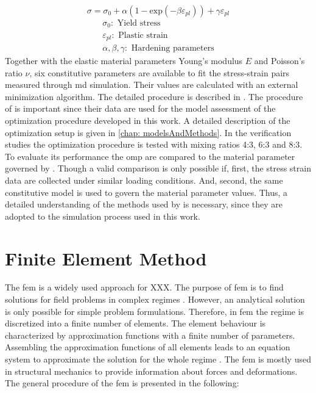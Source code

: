 \begin{equation} \label{eq: voce}
    \sigma = \sigma_0 + \alpha(1 - \text{exp}(-\beta \varepsilon_{pl})) + \gamma \varepsilon_{pl}
\end{equation}
\begin{gather*}
    \sigma_0: \text{ Yield stress} \\
    \varepsilon_{pl}: \text{ Plastic strain} \\
    \alpha, \beta,  \gamma: \text{ Hardening parameters}
\end{gather*}
Together with the elastic material parameters Young's modulus $E$ and Poisson's ratio $\nu$, six constitutive parameters are available to fit the stress-strain pairs measured through \acrshort{md} simulation. Their values are calculated with an external minimization algorithm. The detailed procedure is described in \cite{ries_deciphering_nodate}. The procedure of \citet{ries_deciphering_nodate} is important since their data are used for the model assessment of the optimization procedure developed in this work. A detailed description of the optimization setup is given in \autoref{chap: modelsAndMethods}. In the verification studies the optimization procedure is tested with mixing ratios 4:3, 6:3 and 8:3. To evaluate its performance the \acrlong{omp} are compared to the material parameter governed by \citet{ries_deciphering_nodate}. Though a valid comparison is only possible if, first, the stress strain data are collected under similar loading conditions. And, second, the same constitutive model is used to govern the material parameter values. Thus, a detailed understanding of the methods used by \citet{ries_deciphering_nodate} is necessary, since they are adopted to the simulation process used in this work.  



\section{Finite Element Method} \label{sec: FEMBasics}

The \acrfull{fem} is a widely used approach for XXX. 
The purpose of \acrshort{fem} is to find solutions for field problems in complex regimes \cite{willner_vorlesungsskript_nodate}. However, an analytical solution is only possible for simple problem formulations. Therefore, in \acrshort{fem} the regime is discretized into a finite number of elements. The element behaviour is characterized by approximation functions with a finite number of parameters. Assembling the approximation functions of all elements leads to an equation system to approximate the solution for the whole regime \cite{jagota_finite_nodate}. The \acrshort{fem} is mostly used in structural mechanics to provide information about forces and deformations. The general procedure of the \acrshort{fem} is presented in the following: \\

